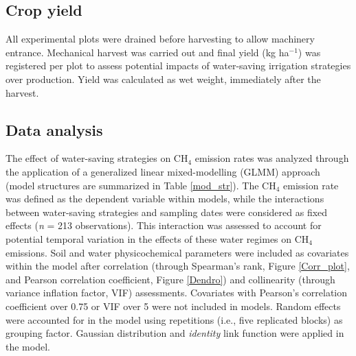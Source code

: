 \subsection{Crop yield}
\label{sec:meth_Yield1}

All experimental plots were drained before harvesting to allow machinery entrance. Mechanical harvest was carried out and final yield (kg ha$^{-1}$) was registered per plot to assess potential impacts of water-saving irrigation strategies over production. Yield was calculated as wet weight, immediately after the harvest.  

\subsection{Data analysis}
\label{sec:meth_Stat1}

The effect of water-saving strategies on CH$_{4}$ emission rates was analyzed through the application of a generalized linear mixed-modelling (GLMM) approach (model structures are summarized in Table \ref{mod_str}). The CH$_{4}$ emission rate was defined as the dependent variable within models, while the interactions between water-saving strategies and sampling dates were considered as fixed effects (\textit{n} = 213 observations). This interaction was assessed to account for potential temporal variation in the effects of these water regimes on CH$_{4}$ emissions. Soil and water physicochemical parameters were included as covariates within the model after correlation (through Spearman's rank, Figure \ref{Corr_plot}, and Pearson correlation coefficient, Figure \ref{Dendro}) and collinearity (through variance inflation factor, VIF) assessments. Covariates with Pearson's correlation coefficient over 0.75 or VIF over 5 were not included in models. Random effects were accounted for in the model using repetitions (i.e., five replicated blocks) as grouping factor. Gaussian distribution and \textit{identity} link function were applied in the model.\\

